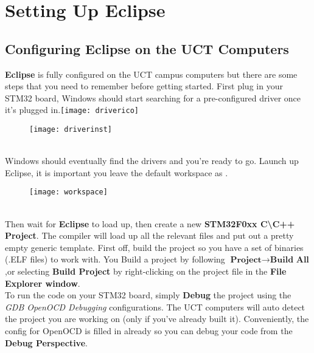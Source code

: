 \chapter{Setting Up Eclipse}
\label{ch:Eclipse}

\section{Configuring Eclipse on the UCT Computers}
\label{sec:EclipseConfig}
\textbf{Eclipse} is fully configured on the UCT campus computers but there are some steps that you need to remember before getting started. First plug in your STM32 board, Windows should start searching for a pre-configured driver once it's plugged in.\texttt{[image: driverico]}\\
\begin{figure}[htbp]
\centering
\texttt{[image: driverinst]}
\end{figure}
\\
Windows should eventually find the drivers and you're ready to go. Launch up Eclipse, it is important you leave the default workspace as \textbf{\color{Aquamarine}{C\textbackslash :Workspace}}.
\begin{figure}[htbp]
\centering
\texttt{[image: workspace]}
\end{figure}
\\
Then wait for \textbf{Eclipse} to load up, then create a new \textbf{\color{Purple}STM32F0xx C\textbackslash C++ Project}. The compiler will load up all the relevant files and put out a pretty empty generic template. First off, build the project so you have a set of binaries (.ELF files) to work with. You Build a project by following {\color{Green} $\textbf{Project}\rightarrow \textbf{Build All}$} ,or selecting \textbf{\color{Purple} Build Project} by right-clicking on the project file in the \textbf{\color{Orange}File Explorer window}.
\\
To run the code on your STM32 board, simply \textbf{\color{Purple} Debug} the project using the \textit{\color{Brown} GDB OpenOCD Debugging} configurations. The UCT computers will auto detect the project you are working on (only if you've already built it). Conveniently, the config for OpenOCD is filled in already so you can debug your code from the \textbf{\color{Orange}Debug Perspective}.
